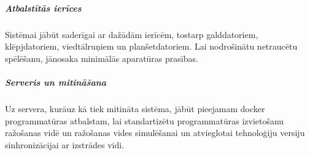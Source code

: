     \subparagraph{Atbalstītās ierīces}

        Sistēmai jābūt saderīgai ar dažādām ierīcēm, tostarp galddatoriem,
        klēpjdatoriem, viedtālruņiem un planšetdatoriem. Lai nodrošinātu
        netraucētu spēlēšanu, jānosaka minimālās aparatūras prasības.

    \subparagraph{Serveris un mitināšana}

        Uz servera, kurāuz kā tiek mitināta sistēma, jābūt pieejamam docker
        programmatūras atbalstam, lai standartizētu programmatūras izvietošanu
        ražošanas vidē un ražošanas vides simulēšanai un atvieglotai
        tehnoloģiju versiju sinhronizācijai ar izstrādes vidi. 
